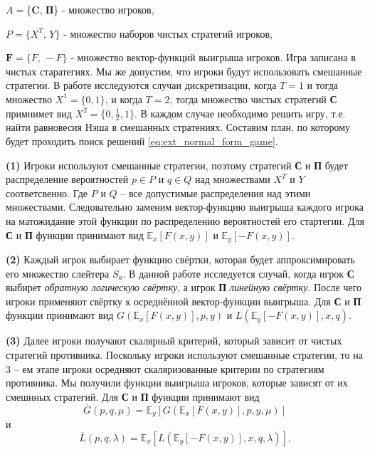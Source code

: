 	$ A = $\{\textbf{C}, \textbf{П}\} - множество игроков,

	$ P = \{X^T, \, Y\}$ - множество наборов чистых
	стратегий игроков,
	
	$ \textbf{F} = \{F, \, -F\}$ - множество вектор-функций выигрыша
	игроков.
\newline
Игра записана в чистых старатегиях. Мы же допустим, что игроки будут 
использовать смешанные стратегии. 
В работе исследуются случаи дискретизации, когда $T=1$ и тогда 
множество $X^1=\{0, 1\}$, и когда 
$T=2$, тогда множество чистых стратегий \textbf{С}
примнимет вид $X^2=\{0, \frac{1}{2} ,1\}$.
В каждом случае необходимо решить игру, т.е. найти
равновесия Нэша в смешанных стратениях. Составим план, по которому
будет проходить поиск решений \eqref{eq:ext_normal_form_game}.

\hspace{3mm}

\textbf{(1)} 
Игроки используют смешанные стратегии, поэтому стратегий \textbf{С} и
\textbf{П} будет распределение вероятностей $p \in P$ и 
$q \in Q$ над множествами $X^T$ и $Y$
соответсвенно. Где $P$ и $Q$ -- все допустимые
распределения над этими множествами.
Следовательно заменим вектор-функцию выигрыша каждого
игрока на матожидание этой функции по распределению вероятностей его
стартегии. Для \textbf{С} и \textbf{П} функции принимают вид 
$\mathbb{E}_x [F(x,y)]$ и $\mathbb{E}_y [-F(x,y)]$.

\hspace{3mm}

\textbf{(2)}
Каждый игрок выбирает функцию свёртки, которая будет аппроксимировать его
множество слейтера $S_a$. В данной работе исследуется случай, когда
игрок \textbf{С} выбирет \textit{обратную логическую свёртку}, 
а игрок \textbf{П} \textit{линейную свёртку}. После чего игроки 
применяют свёртку к осреднённой вектор-функции выигрыша.
Для \textbf{С} и \textbf{П} функции принимают вид 
$G(\mathbb{E}_x [F(x,y)], p, y)$ и $L(\mathbb{E}_y [-F(x,y)], x, q)$.

\hspace{3mm}

\textbf{(3)}
Далее игроки получают скалярный критерий, который зависит от 
чистых стратегий противника. Поскольку игроки используют смешанные стратегии,
то на 3 -- ем этапе игроки осредняют скаляризованные критерии по 
стратегиям противника. Мы получили функции выигрыша игроков, которые
зависят от их смешнных стратегий.
Для \textbf{С} и \textbf{П} функции принимают вид 
$$
	\overline G(p, q, \mu) =
	\mathbb{E}_y [G(\mathbb{E}_x [F(x,y)], p, y, \mu)]
$$ и $$
	\overline L(p, q, \lambda) = 
	\mathbb{E}_x [L(\mathbb{E}_y [-F(x,y)], x, q, \lambda)].
$$

